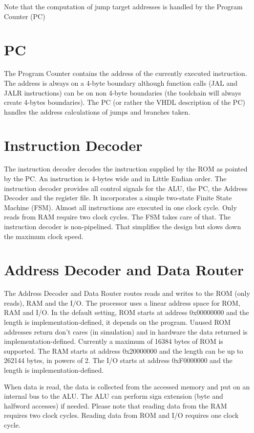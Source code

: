 \documentclass[12pt]{article}
\begin{document}
Note that the computation of jump target addresses is handled by the Program Counter (PC)

\section{PC}
\label{sec:pc}
The Program Counter contains the address of the currently executed instruction. The address is always on a 4-byte boundary although function calls (JAL and JALR instructions) can be on non 4-byte boundaries (the toolchain will always create 4-bytes boundaries). The PC (or rather the VHDL description of the PC) handles the address calculations of jumps and branches taken.

\section{Instruction Decoder}
\label{sec:instructiondecoder}
The instruction decoder decodes the instruction supplied by the ROM as pointed by the PC. An instruction is 4-bytes wide and in Little Endian order. The instruction decoder provides all control signals for the ALU, the PC, the Address Decoder and the register file. It incorporates a simple two-state Finite State Machine (FSM). Almost all instructions are executed in one clock cycle. Only reads from RAM require two clock cycles. The FSM takes care of that. The instruction decoder is non-pipelined. That simplifies the design but slows down the maximum clock speed.

\section{Address Decoder and Data Router}
\label{sec:addressdecoderanddatarouter}
The Address Decoder and Data Router routes reads and writes to the ROM (only reads), RAM and the I/O. The processor uses a linear address space for ROM, RAM and I/O. In the default setting, ROM starts at address 0x00000000 and the length is implementation-defined, it depends on the program. Unused ROM addresses return don't cares (in simulation) and in hardware the data returned is implementation-defined. Currently a maximum of 16384 bytes of ROM is supported. The RAM starts at address 0x20000000 and the length can be up to 262144 bytes, in powers of 2. The I/O starts at address 0xF0000000 and the length is implementation-defined.

When data is read, the data is collected from the accessed memory and put on an internal bus to the ALU. The ALU can perform sign extension (byte and halfword accesses) if needed. Please note that reading data from the RAM requires two clock cycles. Reading data from ROM and I/O requires one clock cycle.
\end{document}
